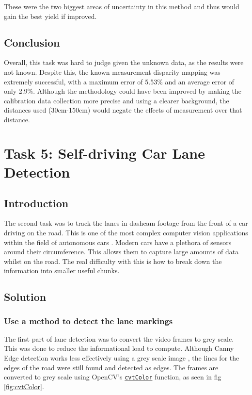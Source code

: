 \documentclass[conference]{IEEEtran}
\begin{document}
These were the two biggest areas of uncertainty in this method and thus would gain the best yield if improved. 

\subsection{Conclusion}
Overall, this task was hard to judge given the unknown data, as the results were not known. Despite this, the known measurement disparity mapping was extremely successful, with a maximum error of 5.53\% and an average error of only 2.9\%. Although the methodology could have been improved by making the calibration data collection more precise and using a clearer background, the distances used (30cm-150cm) would negate the effects of measurement over that distance. 

\section{Task 5: Self-driving Car Lane Detection}
\subsection{Introduction}

The second task was to track the lanes in dashcam footage from the front of a car driving on the road. This is one of the most complex computer vision applications within the field of autonomous cars \cite{Hajare2016AVB}. Modern cars have a plethora of sensors around their circumference. This allows them to capture large amounts of data whilst on the road. The real difficulty with this is how to break down the information into smaller useful chunks.  

\subsection{Solution}

\subsubsection{Use a method to detect the lane markings}

The first part of lane detection was to convert the video frames to grey scale. This was done to reduce the informational load to compute. Although Canny Edge detection works less effectively using a grey scale image \cite{Canny_On_Grey}, the lines for the edges of the road were still found and detected as edges. The frames are converted to grey scale using OpenCV's \href{https://docs.opencv.org/4.x/d8/d01/group__imgproc__color__conversions.html#ga397ae87e1288a81d2363b61574eb8cab}{\texttt{cvtColor}} function, as seen in fig \ref{fig:cvtColor}.
\end{document}
